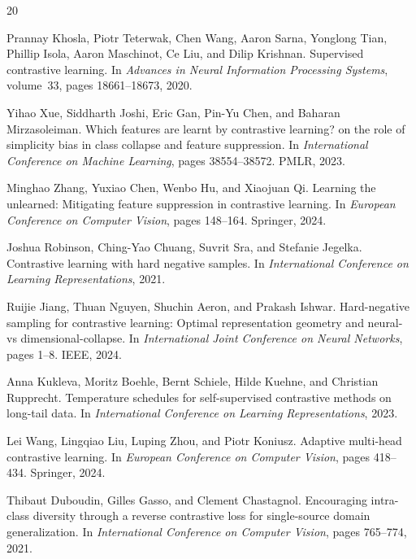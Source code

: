 \documentclass[11pt,a4paper]{article}
\begin{document}

\begin{thebibliography}{20}

Prannay Khosla, Piotr Teterwak, Chen Wang, Aaron Sarna, Yonglong Tian, Phillip Isola, Aaron Maschinot, Ce Liu, and Dilip Krishnan.
\newblock Supervised contrastive learning.
\newblock In \emph{Advances in Neural Information Processing Systems}, volume~33, pages 18661--18673, 2020.

Yihao Xue, Siddharth Joshi, Eric Gan, Pin-Yu Chen, and Baharan Mirzasoleiman.
\newblock Which features are learnt by contrastive learning? on the role of simplicity bias in class collapse and feature suppression.
\newblock In \emph{International Conference on Machine Learning}, pages 38554--38572. PMLR, 2023.

Minghao Zhang, Yuxiao Chen, Wenbo Hu, and Xiaojuan Qi.
\newblock Learning the unlearned: Mitigating feature suppression in contrastive learning.
\newblock In \emph{European Conference on Computer Vision}, pages 148--164. Springer, 2024.

Joshua Robinson, Ching-Yao Chuang, Suvrit Sra, and Stefanie Jegelka.
\newblock Contrastive learning with hard negative samples.
\newblock In \emph{International Conference on Learning Representations}, 2021.

Ruijie Jiang, Thuan Nguyen, Shuchin Aeron, and Prakash Ishwar.
\newblock Hard-negative sampling for contrastive learning: Optimal representation geometry and neural- vs dimensional-collapse.
\newblock In \emph{International Joint Conference on Neural Networks}, pages 1--8. IEEE, 2024.

Anna Kukleva, Moritz Boehle, Bernt Schiele, Hilde Kuehne, and Christian Rupprecht.
\newblock Temperature schedules for self-supervised contrastive methods on long-tail data.
\newblock In \emph{International Conference on Learning Representations}, 2023.

Lei Wang, Lingqiao Liu, Luping Zhou, and Piotr Koniusz.
\newblock Adaptive multi-head contrastive learning.
\newblock In \emph{European Conference on Computer Vision}, pages 418--434. Springer, 2024.

Thibaut Duboudin, Gilles Gasso, and Clement Chastagnol.
\newblock Encouraging intra-class diversity through a reverse contrastive loss for single-source domain generalization.
\newblock In \emph{International Conference on Computer Vision}, pages 765--774, 2021.


\end{thebibliography}
\end{document}
